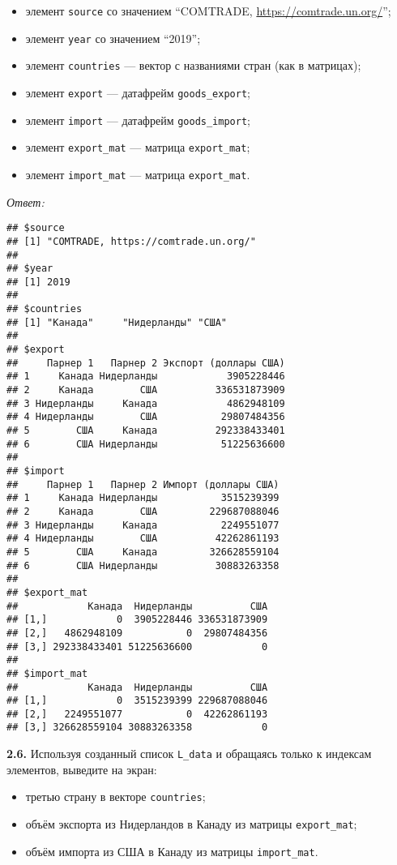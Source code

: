\documentclass[
]{article}
\providecommand{\tightlist}{%
  \setlength{\itemsep}{0pt}\setlength{\parskip}{0pt}}
\begin{document}
\begin{itemize}
\tightlist
\item
  элемент \texttt{source} со значением ``COMTRADE,
  \url{https://comtrade.un.org/}'';
\item
  элемент \texttt{year} со значением ``2019'';
\item
  элемент \texttt{countries} --- вектор с названиями стран (как в
  матрицах);
\item
  элемент \texttt{export} --- датафрейм \texttt{goods\_export};
\item
  элемент \texttt{import} --- датафрейм \texttt{goods\_import};
\item
  элемент \texttt{export\_mat} --- матрица \texttt{export\_mat};
\item
  элемент \texttt{import\_mat} --- матрица \texttt{export\_mat}.
\end{itemize}

\emph{Ответ:}

\begin{verbatim}
## $source
## [1] "COMTRADE, https://comtrade.un.org/"
## 
## $year
## [1] 2019
## 
## $countries
## [1] "Канада"     "Нидерланды" "США"       
## 
## $export
##     Парнер 1   Парнер 2 Экспорт (доллары США)
## 1     Канада Нидерланды            3905228446
## 2     Канада        США          336531873909
## 3 Нидерланды     Канада            4862948109
## 4 Нидерланды        США           29807484356
## 5        США     Канада          292338433401
## 6        США Нидерланды           51225636600
## 
## $import
##     Парнер 1   Парнер 2 Импорт (доллары США)
## 1     Канада Нидерланды           3515239399
## 2     Канада        США         229687088046
## 3 Нидерланды     Канада           2249551077
## 4 Нидерланды        США          42262861193
## 5        США     Канада         326628559104
## 6        США Нидерланды          30883263358
## 
## $export_mat
##            Канада  Нидерланды          США
## [1,]            0  3905228446 336531873909
## [2,]   4862948109           0  29807484356
## [3,] 292338433401 51225636600            0
## 
## $import_mat
##            Канада  Нидерланды          США
## [1,]            0  3515239399 229687088046
## [2,]   2249551077           0  42262861193
## [3,] 326628559104 30883263358            0
\end{verbatim}

\textbf{2.6.} Используя созданный список \texttt{L\_data} и обращаясь
только к индексам элементов, выведите на экран:

\begin{itemize}
\tightlist
\item
  третью страну в векторе \texttt{countries};
\item
  объём экспорта из Нидерландов в Канаду из матрицы
  \texttt{export\_mat};
\item
  объём импорта из США в Канаду из матрицы \texttt{import\_mat}.
\end{itemize}
\end{document}
